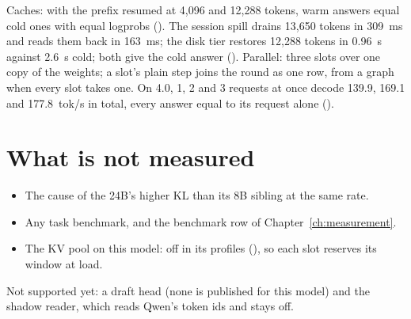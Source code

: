 Caches: with the prefix resumed at 4,096 and 12,288 tokens, warm answers equal cold ones with equal logprobs (). The session spill drains 13,650 tokens in 309~ms and reads them back in 163~ms; the disk tier restores 12,288 tokens in 0.96~s against 2.6~s cold; both give the cold answer (\measured). Parallel: three slots over one copy of the weights; a slot's plain step joins the round as one row, from a graph when every slot takes one. On 4.0, 1, 2 and 3 requests at once decode 139.9, 169.1 and 177.8~tok/s in total, every answer equal to its request alone (\measured).

\section{What is not measured}

\begin{itemize}
\item The cause of the 24B's higher KL than its 8B sibling at the same rate.
\item Any task benchmark, and the benchmark row of Chapter~\ref{ch:measurement}.
\item The KV pool on this model: off in its profiles (), so each slot reserves its window at load.
\end{itemize}

Not supported yet: a draft head (none is published for this model) and the shadow reader, which reads Qwen's token ids and stays off.

